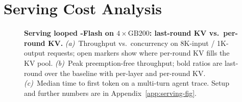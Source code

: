 \section{Serving Cost Analysis}
\label{sec:cost}

\begin{figure}[t]
\centering
{}
\caption{\textbf{Serving looped \vfour-Flash on $4\times\text{GB200}$: last-round KV vs.\ per-round KV.}
\emph{(a)}~Throughput vs.\ concurrency on 8K-input / 1K-output requests; open markers show where per-round KV fills the KV pool.
\emph{(b)}~Peak preemption-free throughput; bold ratios are last-round \ced over the baseline with per-layer and per-round KV.
\emph{(c)}~Median time to first token on a multi-turn agent trace.
Setup and further numbers are in Appendix~\ref{app:serving-fig}.}
\label{fig:p1-pareto}
\end{figure}



